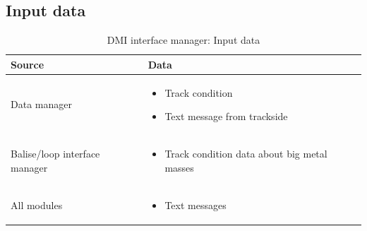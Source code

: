 \documentclass[nocc]{template/openetcs_report}
\begin{document}
\subsection{Input data}
			\begin{longtable}{|l|l|}
				\caption{DMI interface manager: Input data}\\ 
				\hline
				
					\begin{minipage}[t]{0.35\linewidth} \textbf{Source}	\end{minipage} 
				&	\begin{minipage}[t]{0.65\linewidth} \textbf{Data} \end{minipage} \\
				
				\hline
																																									
					\begin{minipage}[t]{0.35\linewidth} Data manager	\end{minipage} 
				&	\begin{minipage}[t]{0.65\linewidth}
						\begin{itemize}
							\item Track condition
							\item Text message from trackside
						\end{itemize}
					\end{minipage} \\
				
				\hline
				
					\begin{minipage}[t]{0.35\linewidth} Balise/loop interface manager\end{minipage} 
				&	\begin{minipage}[t]{0.65\linewidth}
						\begin{itemize}
							\item Track condition data about big metal masses
						\end{itemize}			
					\end{minipage} \\
				
				\hline
					
					\begin{minipage}[t]{0.35\linewidth} All modules\end{minipage} 
				&	\begin{minipage}[t]{0.65\linewidth}
						\begin{itemize}
							\item Text messages
						\end{itemize}			
					\end{minipage} \\
				

\end{longtable}
\end{document}
